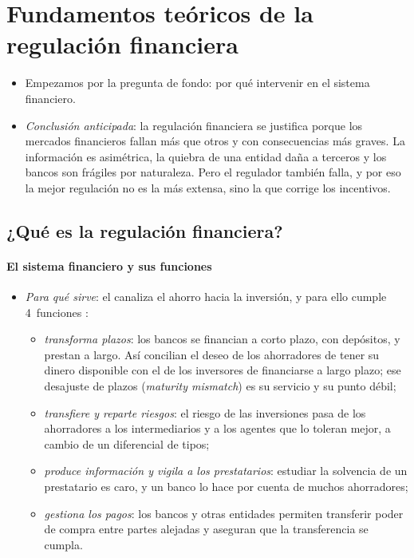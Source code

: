 \documentclass[11pt]{article}
\begin{document}
\section{Fundamentos teóricos de la regulación financiera}\label{sec:fundamentos}

\begin{itemize}
\item Empezamos por la pregunta de fondo: por qué intervenir en el sistema financiero.
\item \emph{Conclusión anticipada}: la regulación financiera se justifica porque los mercados financieros fallan más que otros y con consecuencias más graves. La información es asimétrica, la quiebra de una entidad daña a terceros y los bancos son frágiles por naturaleza. Pero el regulador también falla, y por eso la mejor regulación no es la más extensa, sino la que corrige los incentivos.
\end{itemize}

\subsection{¿Qué es la regulación financiera?}\label{sec:que-es}

\paragraph{El sistema financiero y sus funciones}

\begin{itemize}
\item \emph{Para qué sirve}: el  canaliza el ahorro hacia la inversión, y para ello cumple 4~funciones :
  \begin{itemize}
  \item \emph{transforma plazos}: los bancos se financian a corto plazo, con depósitos, y prestan a largo. Así concilian el deseo de los ahorradores de tener su dinero disponible con el de los inversores de financiarse a largo plazo; ese desajuste de plazos (\emph{maturity mismatch}) es su servicio y su punto débil;
  \item \emph{transfiere y reparte riesgos}: el riesgo de las inversiones pasa de los ahorradores a los intermediarios y a los agentes que lo toleran mejor, a cambio de un diferencial de tipos;
  \item \emph{produce información y vigila a los prestatarios}: estudiar la solvencia de un prestatario es caro, y un banco lo hace por cuenta de muchos ahorradores\nocite{Diamond1984Financial};
  \item \emph{gestiona los pagos}: los bancos y otras entidades permiten transferir poder de compra entre partes alejadas y aseguran que la transferencia se cumpla.
  \end{itemize}
\end{itemize}
\end{document}
